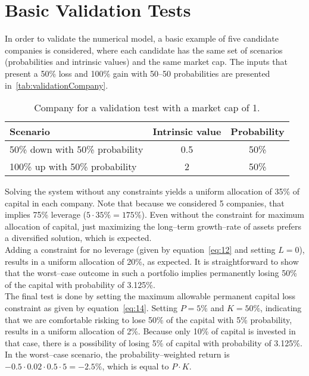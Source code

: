 \documentclass{article}
\begin{document}
\section{Basic Validation Tests}
\label{sec:validation}

\noindent In order to validate the numerical model, a basic example of five
candidate companies is considered, where each candidate has the same set of
scenarios (probabilities and intrinsic values) and the same market cap.
The inputs that present a 50\% loss and 100\% gain with 50--50 probabilities are
presented in~\autoref{tab:validationCompany}.\\

\begin{table}[!ht]
\caption{Company for a validation test with a market cap of 1.}
\vspace{0.25cm}
\centering
\begin{tabular}{l|c|c}
Scenario & Intrinsic value & Probability \\
\hline
50\% down with 50\% probability & 0.5 & 50\% \\
100\% up with 50\% probability & 2 & 50\% \\
\end{tabular}%
\label{tab:validationCompany}%
\end{table}%

\indent Solving the system without any constraints yields a uniform allocation
of 35\% of capital in each company. Note that because we considered 5 companies,
that implies 75\% leverage ($5 \cdot 35\% = 175\%$). Even without the
constraint for maximum allocation of capital, just maximizing the long--term
growth--rate of assets prefers a diversified solution, which is expected.\\

\indent Adding a constraint for no leverage (given by equation~\eqref{eq:12} and
setting $L = 0$), results in a uniform allocation of 20\%, as expected. It is
straightforward to show that the worst--case outcome in such a portfolio implies
permanently losing 50\% of the capital with probability of 3.125\%.\\

\indent The final test is done by setting the maximum allowable permanent
capital loss constraint as given by equation~\eqref{eq:14}. Setting $P = 5\%$
and $K = 50\%$, indicating that we are comfortable risking to lose 50\% of the
capital with 5\% probability, results in a uniform allocation of 2\%. Because
only 10\% of capital is invested in that case, there is a possibility of losing
5\% of capital with probability of 3.125\%. In the worst--case scenario, the
probability--weighted return is $-0.5 \cdot 0.02 \cdot 0.5 \cdot 5 = -2.5\%$,
which is equal to $P \cdot K$.
\end{document}
